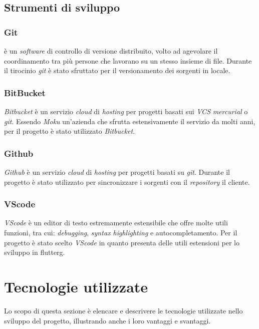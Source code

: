 \subsection{Strumenti di sviluppo}

\subsubsection{Git} è un \textit{software} di controllo di versione distribuito, volto ad agevolare il coordinamento tra più persone che lavorano su un stesso insieme di file. Durante il tirocinio \textit{git} è stato sfruttato per il versionamento dei sorgenti in locale.

\subsubsection{BitBucket} \textit{Bitbucket} è un servizio \textit{cloud} di \textit{hosting} per progetti basati sui \textit{VCS} \textit{mercurial} o \textit{git}. Essendo \textit{Moku} un'azienda che sfrutta estensivamente il servizio da molti anni, per il progetto è stato utilizzato \textit{Bitbucket}.

\subsubsection{Github} \textit{Github} è un servizio \textit{cloud} di \textit{hosting} per progetti basati su \textit{git}. Durante il progetto è stato utilizzato per sincronizzare i sorgenti con il \textit{repository} il cliente.

\subsubsection{VScode} \textit{VScode} è un editor di testo estremamente estensibile che offre molte utili funzioni, tra cui: \textit{debugging}, \textit{syntax highlighting} e autocompletamento. Per il progetto è stato scelto \textit{VScode} in quanto presenta delle utili estensioni per lo sviluppo in \gls{flutterg}.

\section{Tecnologie utilizzate}
Lo scopo di questa sezione è elencare e descrivere le tecnologie utilizzate nello sviluppo del progetto, illustrando anche i loro vantaggi e svantaggi.

